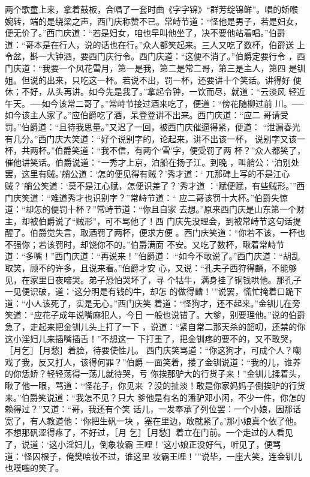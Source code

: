两个歌童上来，拿着鼓板，合唱了一套时曲《字字锦》“群芳绽锦鲜”。唱的娇喉
婉转，端的是绕梁之声，西门庆称赞不已。常峙节道：“怪他是男子，若是妇女，
便无价了。”西门庆道：“若是妇女，咱也早叫他坐了，决不要他站着唱。”伯爵
道：“哥本是在行人，说的话也在行。”众人都笑起来。三人又吃了数杯，伯爵送
上令盆，斟一大钟酒，要西门庆行令。西门庆道：“这便不消了。”伯爵定要行令
，西门庆道：“我要一个风花雪月，第一是我，第二是常二哥，第三是主人，第四
是钏姐。但说的出来，只吃这一杯。若说不出，罚一杯，还要讲十个笑话。讲得好
便休；不好，从头再讲。如今先是我了。”拿起令钟，一饮而尽，就道：“云淡风
轻近午天。──如今该常二哥了。”常峙节接过酒来吃了，便道：“傍花随柳过前
川。──如今该主人家了。”应伯爵吃了酒，呆登登讲不出来。西门庆道：“应二
哥请受罚。”伯爵道：“且待我思量。”又迟了一回，被西门庆催逼得紧，便道：
“泄漏春光有几分。”西门庆大笑道：“好个说别字的，论起来，讲不出该一杯，
说别字又该一杯，共两杯。”伯爵笑道：“我不信，有两个‘雪’字，便受罚了两
杯？”众人都笑了，催他讲笑话。伯爵说道：“一秀才上京，泊船在扬子江。到晚
，叫艄公：‘泊别处罢，这里有贼。’艄公道：‘怎的便见得有贼？’秀才道：‘
兀那碑上写的不是江心贼？’艄公笑道：‘莫不是江心赋，怎便识差了？’秀才道
：‘赋便赋，有些贼形。’”西门庆笑道：“难道秀才也识别字？”常峙节道：“
应二哥该罚十大杯。”伯爵失惊道：“却怎的便罚十杯？”常峙节道：“你且自家
去想。”原来西门庆是山东第一个财主，却被伯爵说了“贼形”，可不骂他了！西
门庆先没理会，到被常峙节这句话提醒了。伯爵觉失言，取酒罚了两杯，便求方便
。西门庆笑道：“你若不该，一杯也不强你；若该罚时，却饶你不的。”伯爵满面
不安。又吃了数杯，瞅着常峙节道：“多嘴！”西门庆道：“再说来！”伯爵道：
“如今不敢说了。”西门庆道：“胡乱取笑，顾不的许多，且说来看。”伯爵才安
心，又说：“孔夫子西狩得麟，不能够见，在家里日夜啼哭。弟子恐怕哭坏了，寻
个牯牛，满身挂了铜钱哄他。那孔子一见便识破，道：‘这分明是有钱的牛，却怎
的做得麟！’”说罢，慌忙掩着口跪下道：“小人该死了，实是无心。”西门庆笑
着道：“怪狗才，还不起来。”金钏儿在旁笑道：“应花子成年说嘴麻犯人，今日
一般也说错了。大爹，别要理他。”说的伯爵急了，走起来把金钏儿头上打了一下
，说道：“紧自常二那天杀的韶叨，还禁的你这小淫妇儿来插嘴插舌！”不想这一
下打重了，把金钏疼的要不的，又不敢哭，［月乞］［月愁］着脸，待要使性儿。
西门庆笑骂道：“你这狗才，可成个人？嘲戏了我，反又打人，该得何罪？”伯爵
一面笑着，搂了金钏说道：“我的儿，谁养的你恁娇？轻轻荡得一荡儿就待哭，亏
你挨那驴大的行货子来！”金钏儿揉着头，瞅了他一眼，骂道：“怪花子，你见来
？没的扯淡！敢是你家妈妈子倒挨驴的行货来。”伯爵笑说道：“我怎不见？只大
爹他是有名的潘驴邓小闲，不少一件，你怎的赖得过？”又道：“哥，我还有个笑
话儿，一发奉承了列位罢：一个小娘，因那话宽了，有人教道他：‘你把生矾一块
，塞在里边，敢就紧了。’那小娘真个依了他。不想那矾涩得疼了，不好过，［月
乞］［月愁］着立在门前。一个走过的人看见了，说道：‘这小淫妇儿，倒象妆霸
王哩！’这小娘正没好气，听见了，便骂道：‘怪囚根子，俺樊哙妆不过，谁这里
妆霸王哩！’”说毕，一座大笑，连金钏儿也噗嗤的笑了。

